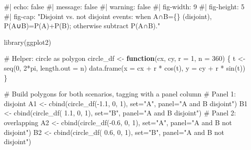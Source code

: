 \documentclass[
  letterpaper,
  DIV=11,
  numbers=noendperiod]{scrreprt}
\newenvironment{Shaded}{\begin{snugshade}}{\end{snugshade}}
\newcommand{\AttributeTok}[1]{\textcolor[rgb]{0.40,0.45,0.13}{#1}}
\newcommand{\CommentTok}[1]{\textcolor[rgb]{0.37,0.37,0.37}{#1}}
\newcommand{\ControlFlowTok}[1]{\textcolor[rgb]{0.00,0.23,0.31}{\textbf{#1}}}
\newcommand{\DecValTok}[1]{\textcolor[rgb]{0.68,0.00,0.00}{#1}}
\newcommand{\FloatTok}[1]{\textcolor[rgb]{0.68,0.00,0.00}{#1}}
\newcommand{\FunctionTok}[1]{\textcolor[rgb]{0.28,0.35,0.67}{#1}}
\newcommand{\NormalTok}[1]{\textcolor[rgb]{0.00,0.23,0.31}{#1}}
\newcommand{\OtherTok}[1]{\textcolor[rgb]{0.00,0.23,0.31}{#1}}
\newcommand{\SpecialCharTok}[1]{\textcolor[rgb]{0.37,0.37,0.37}{#1}}
\newcommand{\StringTok}[1]{\textcolor[rgb]{0.13,0.47,0.30}{#1}}
\begin{document}
\begin{Shaded}
\begin{Highlighting}[]
\CommentTok{\#| echo: false}
\CommentTok{\#| message: false}
\CommentTok{\#| warning: false}
\CommentTok{\#| fig{-}width: 9}
\CommentTok{\#| fig{-}height: 5}
\CommentTok{\#| fig{-}cap: "Disjoint vs. not disjoint events: when A∩B=\{\} (disjoint), P(A∪B)=P(A)+P(B); otherwise subtract P(A∩B)."}

\FunctionTok{library}\NormalTok{(ggplot2)}

\CommentTok{\# Helper: circle as polygon}
\NormalTok{circle\_df }\OtherTok{\textless{}{-}} \ControlFlowTok{function}\NormalTok{(cx, cy, }\AttributeTok{r =} \DecValTok{1}\NormalTok{, }\AttributeTok{n =} \DecValTok{360}\NormalTok{) \{}
\NormalTok{  t }\OtherTok{\textless{}{-}} \FunctionTok{seq}\NormalTok{(}\DecValTok{0}\NormalTok{, }\DecValTok{2}\SpecialCharTok{*}\NormalTok{pi, }\AttributeTok{length.out =}\NormalTok{ n)}
  \FunctionTok{data.frame}\NormalTok{(}\AttributeTok{x =}\NormalTok{ cx }\SpecialCharTok{+}\NormalTok{ r }\SpecialCharTok{*} \FunctionTok{cos}\NormalTok{(t),}
             \AttributeTok{y =}\NormalTok{ cy }\SpecialCharTok{+}\NormalTok{ r }\SpecialCharTok{*} \FunctionTok{sin}\NormalTok{(t))}
\NormalTok{\}}

\CommentTok{\# Build polygons for both scenarios, tagging with a \textquotesingle{}panel\textquotesingle{} column}
\CommentTok{\# Panel 1: disjoint}
\NormalTok{A1 }\OtherTok{\textless{}{-}} \FunctionTok{cbind}\NormalTok{(}\FunctionTok{circle\_df}\NormalTok{(}\SpecialCharTok{{-}}\FloatTok{1.1}\NormalTok{, }\DecValTok{0}\NormalTok{, }\DecValTok{1}\NormalTok{), }\AttributeTok{set=}\StringTok{"A"}\NormalTok{,   }\AttributeTok{panel=}\StringTok{"A and B disjoint"}\NormalTok{)}
\NormalTok{B1 }\OtherTok{\textless{}{-}} \FunctionTok{cbind}\NormalTok{(}\FunctionTok{circle\_df}\NormalTok{( }\FloatTok{1.1}\NormalTok{, }\DecValTok{0}\NormalTok{, }\DecValTok{1}\NormalTok{), }\AttributeTok{set=}\StringTok{"B"}\NormalTok{,   }\AttributeTok{panel=}\StringTok{"A and B disjoint"}\NormalTok{)}
\CommentTok{\# Panel 2: overlapping}
\NormalTok{A2 }\OtherTok{\textless{}{-}} \FunctionTok{cbind}\NormalTok{(}\FunctionTok{circle\_df}\NormalTok{(}\SpecialCharTok{{-}}\FloatTok{0.6}\NormalTok{, }\DecValTok{0}\NormalTok{, }\DecValTok{1}\NormalTok{), }\AttributeTok{set=}\StringTok{"A"}\NormalTok{,   }\AttributeTok{panel=}\StringTok{"A and B not disjoint"}\NormalTok{)}
\NormalTok{B2 }\OtherTok{\textless{}{-}} \FunctionTok{cbind}\NormalTok{(}\FunctionTok{circle\_df}\NormalTok{( }\FloatTok{0.6}\NormalTok{, }\DecValTok{0}\NormalTok{, }\DecValTok{1}\NormalTok{), }\AttributeTok{set=}\StringTok{"B"}\NormalTok{,   }\AttributeTok{panel=}\StringTok{"A and B not disjoint"}\NormalTok{)}


\end{Highlighting}
\end{Shaded}
\end{document}
